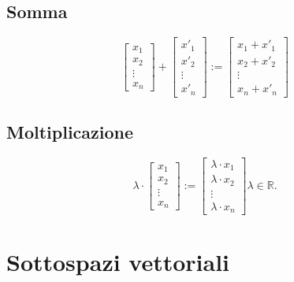 \documentclass[a4paper, 12pt]{report}
\begin{document}
            \subsection{Somma}
                $$
                \begin{bmatrix}
                    x_1\\
                    x_2\\
                    \vdots\\
                    x_n    
                \end{bmatrix}
                +
                \begin{bmatrix}
                    x'_1\\
                    x'_2\\
                    \vdots\\
                    x'_n    
                \end{bmatrix}
                :=
                \begin{bmatrix}
                    x_1+x'_1\\
                    x_2+x'_2\\
                    \vdots\\
                    x_n+x'_n    
                \end{bmatrix}
                $$
            \subsection{Moltiplicazione}
                $$
                \lambda \cdot
                \begin{bmatrix}
                    x_1\\
                    x_2\\
                    \vdots\\
                    x_n    
                \end{bmatrix}
                := 
                \begin{bmatrix}
                    \lambda \cdot x_1\\
                    \lambda \cdot x_2\\
                    \vdots\\
                    \lambda \cdot x_n    
                \end{bmatrix}
                \lambda \in \mathbb{R}.
                $$
            \section{Sottospazi vettoriali}
\end{document}
